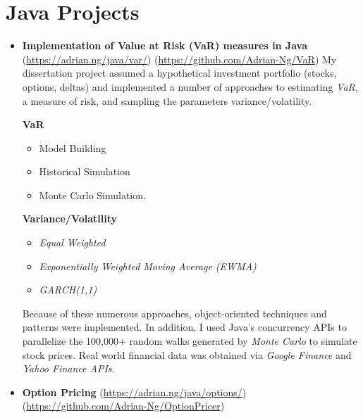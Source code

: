 \documentclass[letterpaper,11pt]{article}
\begin{document}
\section{Java Projects}
\begin{itemize}
	\item {
	      \textbf{Implementation of Value at Risk (VaR) measures in Java}
	      \hfill
	      \tiny
	      (\href{https://adrian.ng/java/var/}{https://adrian.ng/java/var/})
	      \hfill
	      (\href{https://github.com/Adrian-Ng/VaR}{https://github.com/Adrian-Ng/VaR})
	      \newline
	      \small
	      My dissertation project assumed a hypothetical investment portfolio (stocks, options, deltas) and implemented a number of approaches to estimating \textit{VaR}, a measure of risk, and sampling the parameters variance/volatility.
	      \begin{multicols}{2}
		      \textbf{VaR}
		      \begin{itemize}
			      \item Model Building
			      \item Historical Simulation
			      \item Monte Carlo Simulation.
		      \end{itemize}
		      \columnbreak
		      \textbf{Variance/Volatility}
		      \begin{itemize}
			      \item \textit{Equal Weighted}
			      \item \textit{Exponentially Weighted Moving Average (EWMA)}
			      \item \textit{GARCH(1,1)}
		      \end{itemize}
	      \end{multicols}
	      Because of these numerous approaches, object-oriented techniques and patterns were implemented.
	      In addition, I used Java's concurrency APIs to parallelize the 100,000+ random walks generated by \textit{Monte Carlo} to simulate stock prices.
	      Real world financial data was obtained via \textit{Google Finance} and \textit{Yahoo Finance APIs}.
	      }
	\item
	      {
	      \textbf{Option Pricing}
	      \hfill
	      \tiny
	      (\href{https://adrian.ng/java/options/}{https://adrian.ng/java/options/}) \quad (\href{https://github.com/Adrian-Ng/OptionPricer}{https://github.com/Adrian-Ng/OptionPricer})
}
\end{itemize}
\end{document}

